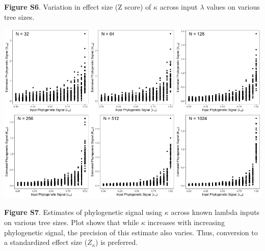\documentclass[]{article}
\begin{document}
\textbf{Figure S6}. Variation in effect size (Z score) of \(\kappa\)
across input \(\lambda\) values on various tree sizes. \hfill\break

\includegraphics[width=0.95\linewidth]{FigS7}

\textbf{Figure S7}. Estimates of phylogenetic signal using \(\kappa\)
across known lambda inputs on various tree sizes. Plot shows that while
\(\kappa\) increases with increasing phylogenetic signal, the precision
of this estimate also varies. Thus, conversion to a standardized effect
size (\(Z_{\kappa}\)) is preferred.
\end{document}
